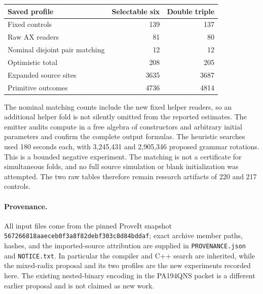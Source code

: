 \documentclass[11pt]{article}
\begin{document}
\begin{center}
\begin{tabular}{lrr}
\toprule
Saved profile & Selectable six & Double triple\\
\midrule
Fixed controls &139&137\\
Raw AX readers &81&80\\
Nominal disjoint pair matching &12&12\\
Optimistic total &208&205\\
Expanded source sites &3635&3687\\
Primitive outcomes &4736&4814\\
\bottomrule
\end{tabular}
\end{center}

The nominal matching counts include the new fixed helper readers, so an
additional helper fold is not silently omitted from the reported estimates.
The emitter audits compute in a free algebra of constructors and arbitrary
initial parameters and confirm the complete output formulas. The heuristic
searches used 180 seconds each, with 3,245,431 and 2,905,346 proposed grammar
rotations. This is a bounded negative experiment. The matching is not a
certificate for simultaneous folds, and no full source simulation or blank
initialization was attempted. The two raw tables therefore remain research
artifacts of 220 and 217 controls.

\paragraph{Provenance.}
All input files come from the pinned ProveIt snapshot
\texttt{567266818aaeceb0f3a8f82debf303c8d84bddaf}; exact archive member paths,
hashes, and the imported-source attribution are supplied in
\texttt{PROVENANCE.json} and \texttt{NOTICE.txt}. In particular the compiler and
C++ search are inherited, while the mixed-radix proposal and its two profiles
are the new experiments recorded here. The existing nested-binary encoding
in the PA194QNS packet is a different earlier proposal and is not claimed as
new work.
\end{document}
